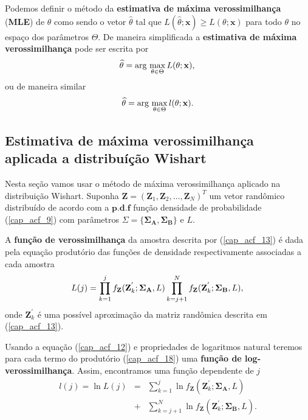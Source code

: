\documentclass[conference]{IEEEtran}
\begin{document}
Podemos definir o método da \textbf{estimativa de máxima verossimilhança} (\textbf{MLE}) de $\theta$ como sendo o vetor $\widehat{\theta}$ tal que $L(\widehat{\theta};\mathbf{x})\ge L(\theta;\mathbf{x})$ para todo $\theta$ no espaço dos parâmetros $\Theta$. De maneira simplificada a \textbf{estimativa de máxima verossimilhança} pode ser escrita por 
\begin{equation}
    \widehat{\theta}= \text{arg}\,\max\limits_{\theta\in\Theta}L(\theta;\mathbf{x}),\\
\end{equation}
ou de maneira similar 
\begin{equation}
    \widehat{\theta}= \text{arg}\,\max\limits_{\theta\in\Theta}l(\theta;\mathbf{x}).\\
\end{equation}

\subsection{Estimativa de máxima verossimilhança aplicada a distribuíção Wishart}

Nesta seção vamos usar o método de máxima verossimilhança aplicado na distribuição Wishart. Suponha $\mathbf{Z}=(\mathbf{Z}_1,\mathbf{Z}_2,\dots,\mathbf{Z}_N)^T$ um vetor randômico distribuído de acordo com a $\mathbf{p.d.f}$ função densidade de probabilidade (\ref{cap_acf_9}) com parâmetros $\Sigma=\{\mathbf{\Sigma_A}, \mathbf{\Sigma_B\}}$ e $L$.

A \textbf{função de verossimilhança} da amostra descrita por (\ref{cap_acf_13}) é dada pela equação produtório das funções de densidade respectivamente associadas a cada amostra
\begin{equation}
	L(j)=\prod_{k=1}^{j}f_{\mathbf{Z}}(\mathbf{Z}_{k}^{'};\mathbf{\Sigma_{A}},L) \prod_{k=j+1}^{N}f_{\mathbf{Z}}(\mathbf{Z}_{k}^{'};\mathbf{\Sigma_{B}},L), \\
\end{equation}
onde $\mathbf{Z}_{k}^{'}$ é uma possível aproximação da matriz randômica descrita em (\ref{cap_acf_13}).

Usando a equação (\ref{cap_acf_12}) e propriedades de logaritmos natural teremos para cada termo do produtório (\ref{cap_acf_18}) uma \textbf{função de log-verossimilhança}. Assim, encontramos uma função dependente de $j$
\begin{equation}
\begin{array}{rcl}
	l(j)=\ln L(j)&=&\sum_{k=1}^{j}\ln f_{\mathbf{Z}}(\mathbf{Z}_{k}^{'};\mathbf{\Sigma_{A}},L)\\
	             &+&\sum_{k=j+1}^{N}\ln f_{\mathbf{Z}}(\mathbf{Z}_{k}^{'};\mathbf{\Sigma_{B}},L).
\end{array}
\end{equation}
\end{document}
